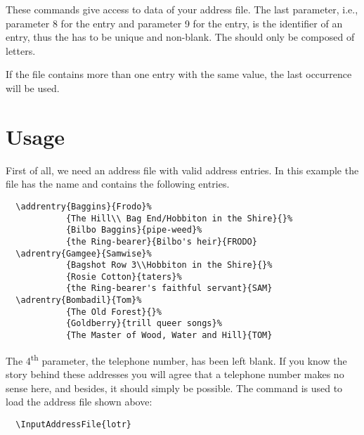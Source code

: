 These commands give access to data of your address file.  The last
parameter, i.e., parameter 8 for the  entry and
parameter 9 for the  entry, is the identifier of an
entry, thus the  has to be unique and non-blank. The
 should only be composed of letters.

If the file contains more than one entry with the same 
value, the last occurrence will be used.


%
%
%
%
%

\section{Usage}\label{sec:scraddr.usage}

First of all, we need an address file with valid address entries.  In
this example the file has the name  and contains the
following entries.
\begin{lstlisting}
  \addrentry{Baggins}{Frodo}%
            {The Hill\\ Bag End/Hobbiton in the Shire}{}%
            {Bilbo Baggins}{pipe-weed}%
            {the Ring-bearer}{Bilbo's heir}{FRODO}
  \adrentry{Gamgee}{Samwise}%
            {Bagshot Row 3\\Hobbiton in the Shire}{}%
            {Rosie Cotton}{taters}%
            {the Ring-bearer's faithful servant}{SAM}
  \adrentry{Bombadil}{Tom}%
            {The Old Forest}{}%
            {Goldberry}{trill queer songs}%
            {The Master of Wood, Water and Hill}{TOM}
\end{lstlisting}

The 4\textsuperscript{th} parameter, the telephone number, has been
left blank. If you know the story behind these addresses you will
agree that a telephone number makes no sense here, and besides, it
should simply be possible. The command  is
used to load the address file shown above:
\begin{lstlisting}
  \InputAddressFile{lotr}
\end{lstlisting}


